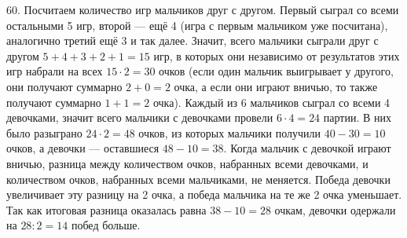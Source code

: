 60. Посчитаем количество игр мальчиков друг с другом. Первый сыграл со всеми остальными 5 игр, второй --- ещё 4 (игра с первым мальчиком уже посчитана), аналогично третий ещё 3 и так далее. Значит, всего мальчики сыграли друг с другом $5+4+3+2+1=15$ игр, в которых они независимо от результатов этих игр набрали на всех $15\cdot2=30$ очков (если один мальчик выигрывает у другого, они получают суммарно $2+0=2$ очка, а если они играют вничью, то также получают суммарно $1+1=2$ очка). Каждый из 6 мальчиков сыграл со всеми 4 девочками, значит всего мальчики с девочками провели $6\cdot4=24$ партии. В них было разыграно $24\cdot2=48$ очков, из которых мальчики получили $40-30=10$ очков, а девочки --- оставшиеся $48-10=38.$ Когда мальчик с девочкой играют вничью, разница между количеством очков, набранных всеми девочками, и количеством очков, набранных всеми мальчиками, не меняется. Победа девочки увеличивает эту разницу на 2 очка, а победа мальчика на те же 2 очка уменьшает. Так как итоговая разница оказалась равна $38-10=28$ очкам, девочки одержали на $28:2=14$ побед больше.\\
